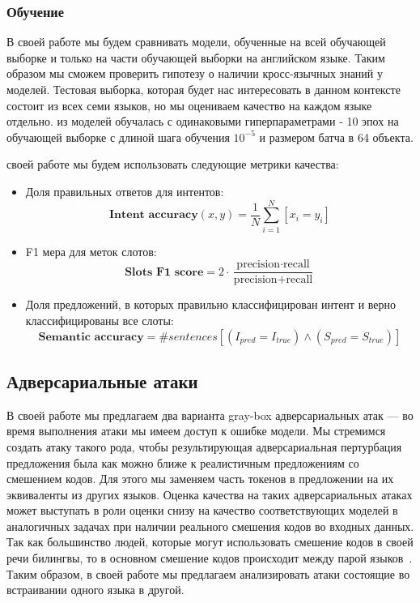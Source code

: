 \subsubsection{Обучение}
В своей работе мы будем сравнивать модели, обученные на всей обучающей выборке и только на части обучающей выборки на английском языке.
Таким образом мы сможем проверить гипотезу о наличии кросс-язычных знаний у моделей.
Тестовая выборка, которая будет нас интересовать в данном контексте состоит из всех семи языков, но мы оцениваем качество на каждом языке отдельно.
 из моделей обучалась с одинаковыми гиперпараметрами - 10 эпох на обучающей выборке с длиной шага обучения $10^{-5}$ и размером батча в 64 объекта.

 своей работе мы будем использовать следующие метрики качества:
\begin{itemize}
    \item Доля правильных ответов для интентов:
    \begin{equation}
        \textbf{Intent accuracy}(x, y) = \dfrac{1}{N} \sum_{i = 1}^{N} [x_i = y_i]\label{eq:equation}
    \end{equation}
    \item F1 мера для меток слотов:
    \begin{equation}
        \textbf{Slots F1 score} = 2 \cdot \dfrac{\text{precision} \cdot \text{recall}}{\text{precision} + \text{recall}}\label{eq:equation2}
    \end{equation}
    \item Доля предложений, в которых правильно классифицирован интент и верно классифицированы все слоты:
    \begin{equation}
        \textbf{Semantic accuracy} = \# sentences [ \left(I_{pred} = I_{true} \right) \land \left(S_{pred} = S_{true} \right)]\label{eq:equation3}
    \end{equation}
\end{itemize}

\subsection{Адверсариальные атаки}
В своей работе мы предлагаем два варианта gray-box адверсариальных атак — во время выполнения атаки мы имеем доступ к ошибке модели.
Мы стремимся создать атаку такого рода, чтобы результирующая адверсариальная пертурбация предложения была как можно ближе к реалистичным предложениям со смешением кодов.
Для этого мы заменяем часть токенов в предложении на их эквиваленты из других языков.
Оценка качества на таких адверсариальных атаках может выступать в роли оценки снизу на качество соответствующих моделей в аналогичных задачах при наличии реального смешения кодов во входных данных. \\
Так как большинство людей, которые могут использовать смешение кодов в своей речи билингвы, то в основном смешение кодов происходит между парой языков~\cite{bilinguals}.
Таким образом, в своей работе мы предлагаем анализировать атаки состоящие во встраивании одного языка в другой.

